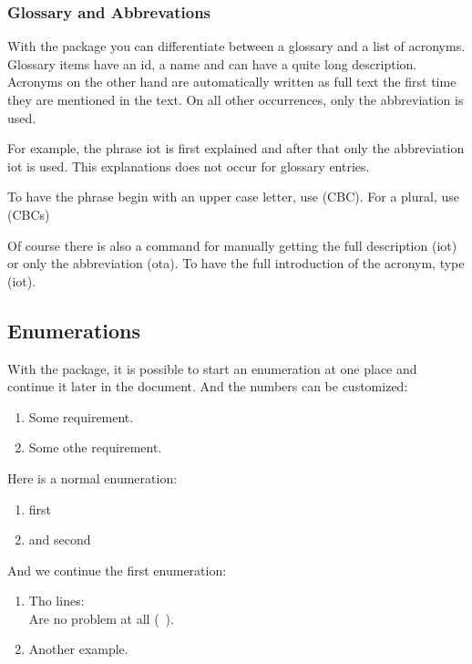 \subsubsection{Glossary and Abbrevations}
With the  package you can differentiate between a glossary and a list of acronyms.
Glossary items have an id, a name and can have a quite long description.
Acronyms on the other hand are automatically written as full text the first time they are mentioned in the text.
On all other occurrences, only the abbreviation is used.



For example, the phrase \gls{iot} is first explained and after that only the abbreviation \gls{iot} is used.
This explanations does not occur for glossary entries.

To have the phrase begin with an upper case letter, use  (\Gls{CBC}).
For a plural, use  (\glspl{CBC})

Of course there is also a command for manually getting the full description  (\acrlong{iot}) or only the abbreviation  (\acrshort{ota}).
To have the full introduction of the acronym, type  (\acrfull{iot}).


\subsection{Enumerations}
With the  package, it is possible to start an enumeration at one place and continue it later in the document.
And the numbers can be customized:

\begin{enumerate}[label=\textbf{R\arabic*},rightmargin=0.7cm,series=basicreq]
\item \label{req:example1}
Some requirement.
\item \label{req:example2}
Some othe requirement.
\end{enumerate}

Here is a normal enumeration:
\begin{enumerate}
    \item first
    \item and second
\end{enumerate}

And we continue the first enumeration:
\begin{enumerate}[basicreq]
\item \label{req:example3}
Tho lines:\\
Are no problem at all (\vgl~\cite{AllegroSoft:2011}).
\item \label{req:example4}
Another example.
\end{enumerate}
